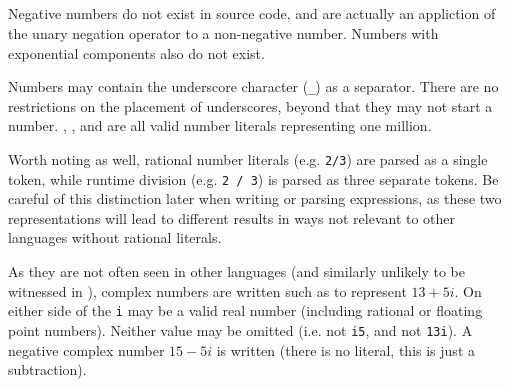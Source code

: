 \begin{bnf*}
     \\
     \\
     \\
     \\
     \\
     \\
     \\
     \\
     \\
\end{bnf*}

Negative numbers do not exist in source code, and are actually
an appliction of the unary negation operator \op{-} to a non-negative number.
Numbers with exponential components also do not exist.

Numbers may contain the underscore character (\texttt{\_}) as a separator.
There are no restrictions on the placement of underscores, beyond that they
may not start a number. , , and
 are all valid number literals representing one
million.

Worth noting as well, rational number literals (e.g. \texttt{2/3}) are
parsed as a single token, while runtime division (e.g. \texttt{2 / 3})
is parsed as three separate tokens. Be careful of this distinction later
when writing or parsing expressions, as these two representations will
lead to different results in ways not relevant to other languages without
rational literals.

As they are not often seen in other languages (and similarly unlikely to
be witnessed in \Trilogy{}), complex numbers are written such as 
to represent $13 + 5i$. On either side of the \texttt{i} may be a valid
real number (including rational or floating point numbers). Neither value
may be omitted (i.e.  not \texttt{i5}, and  not
\texttt{13i}). A negative complex number $15 - 5i$ is written 
(there is no literal, this is just a subtraction).

